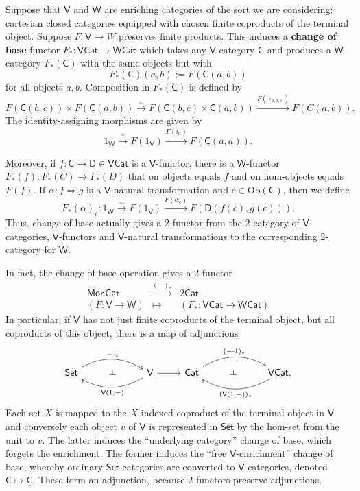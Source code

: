 \documentclass{amsart}
\theoremstyle{definition}
\def\ld{\rotatebox[origin=c]{-90}{$\dashv$}} %
\newcommand{\Set}{\mathsf{Set}}
\newcommand{\Cat}{\mathsf{Cat}}
\newcommand{\Mon}{\mathsf{Mon}}
\newcommand{\V}{\mathsf{V}}
\newcommand{\W}{\mathsf{W}}
\newcommand{\D}{\mathsf{D}}
\newcommand{\C}{\mathsf{C}}
\newcommand{\Obj}{\mathrm{Ob}}
\newcommand{\maps}{\colon}
\begin{document}
Suppose that $\V$ and $\W$ are enriching categories of the sort we are considering: 
cartesian closed categories equipped with chosen finite coproducts of the terminal object.
Suppose $F \maps \V \to W$ preserves finite products.   This induces a \textbf{change of base} functor $F_*\maps\V\Cat \to \W\Cat$ \cite{borceux} which takes any $\V$-category $\C$ and produces a $\W$-category $F_*(\C)$ with the same objects but with
\[      F_*(\C)(a,b) := F(\C(a,b)) \]
for all objects $a,b$.   Composition in $F_*(\C)$ is defined by
\[       F(\C(b,c)) \times F(\C(a,b)) \stackrel{\sim}{\longrightarrow} F(\C(b,c) \times \C(a,b)) 
\xrightarrow{F(\circ_{a,b,c})} F(C(a,b)) . \]  
The identity-assigning morphisms are given by
\[          1_\W \stackrel{\sim}{\longrightarrow} F(1_\V) \xrightarrow{F(i_a)} F(\C(a,a)) .\]

Moreover, if $f\maps \C \to \D \in \V\Cat$ is a $\V$-functor, there is a $\W$-functor $F_*(f) \maps F_*(C) \to F_*(D)$ that on objects equals $f$ and on hom-objects equals $F(f)$. If $\alpha\maps f \Rightarrow g$ is a $\V$-natural transformation and $c\in \Obj(\C)$, then we define
\[F_*(\alpha)_c\maps 1_\W \stackrel{\sim}{\longrightarrow} F(1_\V) \xrightarrow{F(\alpha_c)} F(\D(f(c),g(c))).\]
Thus, change of base actually gives a 2-functor from the 2-category of $\V$-categories, 
$\V$-functors and $\V$-natural transformations to the corresponding 2-category for $\W$.

In fact, the change of base operation gives a 2-functor
\[\begin{array}{ccc}
\Mon\Cat & \xrightarrow{(-)_*} & 2\Cat\\
(F\maps \V\to\W) & \mapsto & (F_*\maps \V\Cat\to\W\Cat)
\end{array}\]
In particular, if $\V$ has not just finite coproducts of the terminal object, but all 
coproducts of this object, there is a map of adjunctions
\[\begin{tikzcd}
	\Set \arrow[bend left,below]{rr}{-\cdot 1}
	& \ld &
	\arrow[bend left,above]{ll}{\V(1,-)} \V
	\arrow[maps to]{r}
	& \Cat \arrow[bend left,below]{rr}{(-\cdot 1)_*}
	& \ld &
	\arrow[bend left,above]{ll}{(\V(1,-))_*} \V\Cat.
\end{tikzcd}\]
Each set $X$ is mapped to the $X$-indexed coproduct of the terminal object in $\V$ and conversely each object $v$ of $\V$ is represented in $\Set$ by the hom-set from the unit to $v$. The latter induces the ``underlying category'' change of base, which forgets the enrichment. The former induces the ``free $\V$-enrichment'' change of base, whereby ordinary $\Set$-categories are converted to $\V$-categories, denoted $\C \mapsto \underline{\C}$. These form an adjunction, because 2-functors preserve adjunctions.
\end{document}

